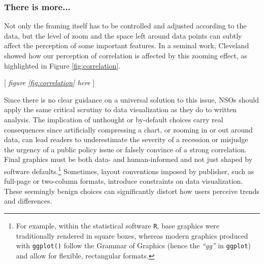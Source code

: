 \documentclass[11pt,twoside,a4paper]{article}
\begin{document}
\subsubsection*{There is more...}

Not only the framing itself has to be controlled and adjusted according to the data, but the level of zoom and the space left around data points can subtly affect the perception of some important features. In a seminal work, Cleveland  \citep{Cleveland1982} showed how our perception of correlation is affected by this zooming effect, as highlighted in Figure \ref{fig:correlation}. 

\begin{center}
    [ \textit{figure \ref{fig:correlation}  here}  ]
\end{center}


 Since there is no clear guidance on a universal solution to this issue, NSOs should apply the same critical scrutiny to data visualization as they do to written analysis. The implication of unthought or by-default choices carry real consequences since artificially compressing a chart, or zooming in or out around data,   can lead readers to underestimate the severity of a recession or misjudge the urgency of a public policy issue or falsely convince of a strong correlation. Final graphics must be both data- and human-informed and not just shaped by software defaults.\footnote{For example, within the statistical software \texttt{R}, base graphics were traditionally rendered in square boxes, whereas modern graphics produced with \texttt{ggplot()} follow the Grammar of Graphics \citep{wilkinson1999} (hence the \textit{“gg”} in \texttt{ggplot}) and allow for flexible, rectangular formats.}  Sometimes, layout conventions imposed by publisher, such as full-page or two-column formats, introduce constraints on data visualization. These seemingly benign choices can significantly distort how users perceive trends and differences.\\
\end{document}
